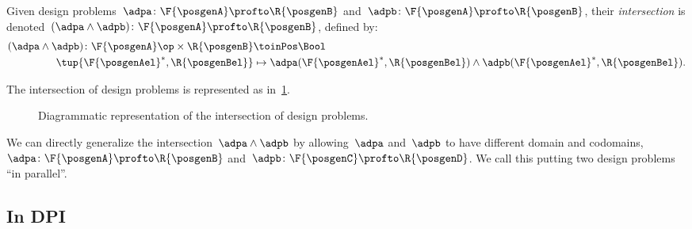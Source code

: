 \begin{definition}
    \label{def:intersection_dp}
    \label{def:dp-intersection}
    Given design problems~$\adpa\colon \F{\posgenA} \profto \R{\posgenB}$ and~$\adpb\colon \F{\posgenA} \profto \R{\posgenB}$,
    their \emph{intersection} is denoted~$(\adpa \wedge \adpb)\colon \F{\posgenA} \profto \R{\posgenB}$, defined by:
    \begin{equation}
        \begin{aligned}
        (\adpa \wedge \adpb)
            \colon \F{\posgenA}\op \times \R{\posgenB} & \toinPos \Bool \\
            \tup{\F{\posgenAel}^*, \R{\posgenBel}} & \mapsto \adpa(\F{\posgenAel}^*, \R{\posgenBel}) \wedge  \adpb(\F{\posgenAel}^*, \R{\posgenBel}).
        \end{aligned}
    \end{equation}
\end{definition}
The intersection of design problems is represented as in~\cref{fig:intersectiondp}.

\begin{figure}[h!]
    \begin{center}
    \end{center}
    \caption{Diagrammatic representation of the intersection of design problems. }
    \label{fig:intersectiondp}
\end{figure}

We can directly generalize the intersection~$\adpa \wedge \adpb$ by allowing~$\adpa$ and~$\adpb$ to have different domain and codomains,~$\adpa \colon \F{\posgenA} \profto \R{\posgenB}$ and~$\adpb \colon \F{\posgenC} \profto \R{\posgenD}$.
We call this putting two design problems ``in parallel''.

\subsection{In DPI}\label{subsec:dpi-intersection}

